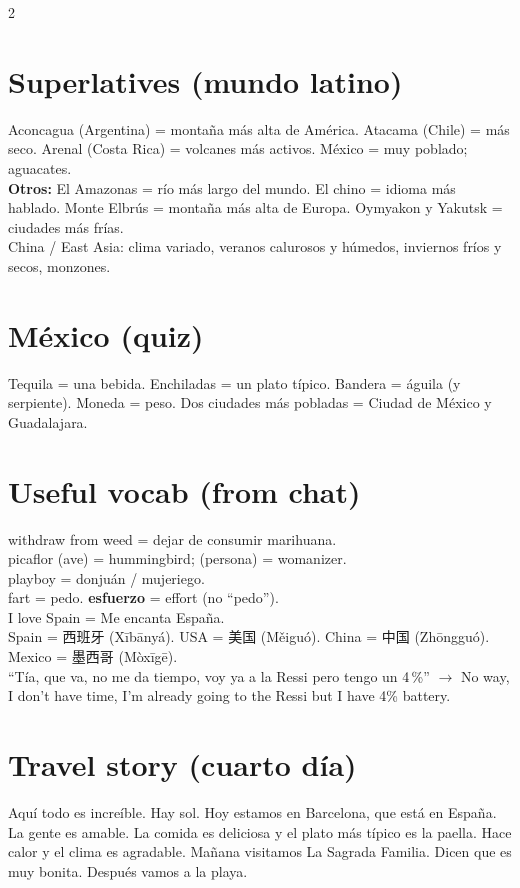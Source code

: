 \documentclass[10pt,landscape,a4paper]{article}
\begin{document}
\begin{multicols}{2}
\section*{\color{accent}Superlatives (mundo latino)}
Aconcagua (Argentina) = monta\~na m\'as alta de Am\'erica. Atacama (Chile) = m\'as seco. Arenal (Costa Rica) = volcanes m\'as activos. M\'exico = muy poblado; aguacates.\\
\textbf{Otros:} El Amazonas = r\'io m\'as largo del mundo. El chino = idioma m\'as hablado. Monte Elbr\'us = monta\~na m\'as alta de Europa. Oymyakon y Yakutsk = ciudades m\'as fr\'ias.\\
China / East Asia: clima variado, veranos calurosos y h\'umedos, inviernos fr\'ios y secos, monzones.

\section*{\color{accent}M\'exico (quiz)}
Tequila = una bebida. Enchiladas = un plato t\'ipico. Bandera = \'aguila (y serpiente). Moneda = peso. Dos ciudades m\'as pobladas = Ciudad de M\'exico y Guadalajara.

\section*{\color{accent}Useful vocab (from chat)}
withdraw from weed = dejar de consumir marihuana.\\
picaflor (ave) = hummingbird; (persona) = womanizer.\\
playboy = donju\'an / mujeriego.\\
fart = pedo. \textbf{esfuerzo} = effort (no ``pedo'').\\
I love Spain = Me encanta Espa\~na.\\
Spain = 西班牙 (Xībānyá). USA = 美国 (Měiguó). China = 中国 (Zhōngguó). Mexico = 墨西哥 (Mòxīgē).\\
``T\'ia, que va, no me da tiempo, voy ya a la Ressi pero tengo un 4\,\%'' $\to$ No way, I don't have time, I'm already going to the Ressi but I have 4\% battery.

\section*{\color{accent}Travel story (cuarto d\'ia)}
Aqu\'i todo es incre\'ible. Hay sol. Hoy estamos en Barcelona, que est\'a en Espa\~na. La gente es amable. La comida es deliciosa y el plato m\'as t\'ipico es la paella. Hace calor y el clima es agradable. Ma\~nana visitamos La Sagrada Familia. Dicen que es muy bonita. Despu\'es vamos a la playa.


\end{multicols}
\end{document}
